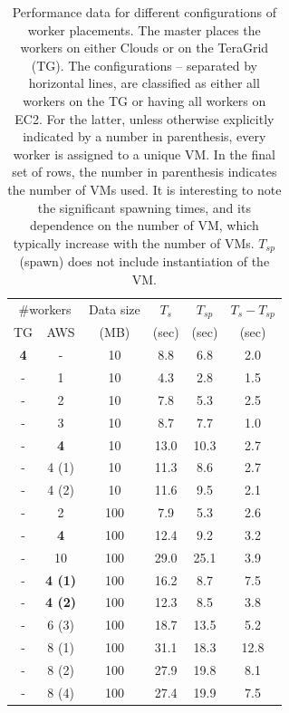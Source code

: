 \documentclass[3p,twocolumn]{elsarticle}
\begin{document}
\begin{table}
  \upp
  \footnotesize
  \begin{tabular}{cccccc}
    \hline
    \multicolumn{2}{c}{\#workers}  &  Data size   &  $T_s$  & $T_{sp}$ & $T_s - T_{sp}$\\   
    TG &  AWS &   (MB)  & (sec) & (sec)  & (sec) \\
    \hline
    { {\bf 4}} & - & 10  &  8.8 &  6.8 & 2.0 \\
    \hline 
    - & 1 & 10 & 4.3 & 2.8 & 1.5 \\
    - & 2 & 10 & 7.8 & 5.3 & 2.5 \\ 
    - & 3 & 10 & 8.7 & 7.7 & 1.0 \\
    - & {\bf 4} & 10 & 13.0 & 10.3 & 2.7 \\
    - & 4 (1) & 10 & 11.3 & 8.6 & 2.7 \\
    - & 4 (2) & 10 & 11.6 & 9.5 & 2.1 \\
    \hline 
    -  & 2  & 100 & 7.9  & 5.3 & 2.6 \\
    -  & {\bf 4}  & 100 & 12.4 & 9.2 & 3.2\\
    -  & 10 & 100 & 29.0 & 25.1 & 3.9 \\
    \hline
    - & {\bf 4 (1)} & 100 & 16.2 & 8.7 & 7.5 \\ 
    - & {\bf 4 (2)} & 100 & 12.3 & 8.5 & 3.8 \\
    - & 6 (3) & 100 & 18.7 & 13.5 & 5.2\\
    - & 8 (1) & 100 & 31.1 & 18.3 & 12.8 \\
    - & 8 (2) & 100 & 27.9 & 19.8 & 8.1\\
    - & 8 (4) & 100 & 27.4 & 19.9 & 7.5\\
    \hline \hline
  \end{tabular}
  \caption{Performance data for different configurations of worker
  placements. The master places the workers on either Clouds or on the
  TeraGrid (TG). The configurations -- separated by horizontal lines,
  are classified as either all workers on the TG or having all workers
  on EC2. For the latter, unless otherwise explicitly indicated by a
  number in parenthesis, every worker is assigned to a unique VM. In
  the final set of rows, the number  in parenthesis indicates the
  number of VMs used. It is interesting to note the significant
  spawning times, and its dependence on the number of VM, which
  typically increase with the number of VMs. $T_{sp}$ (spawn) does not
  include instantiation of the VM.
  \label{stuff-1}}

  
\end{table}
\end{document}
